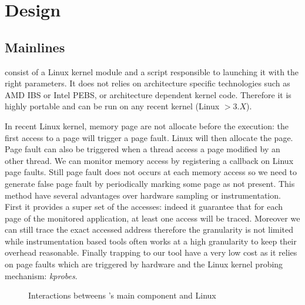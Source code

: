 \section{Design}
\label{sec:design}

\subsection{Mainlines}

\Moca consist of a Linux kernel module and a script responsible to launching it
with the right parameters. It does not relies on architecture specific
technologies such as AMD IBS or Intel PEBS, or architecture dependent kernel
code. Therefore it is highly portable and can be run on any recent kernel
(Linux $> 3.X$).

In recent Linux kernel, memory page are not allocate before the execution: the
first access to a page will trigger a page fault. Linux will then allocate the
page. Page fault can also be triggered when a thread access a page modified by
an other thread. We can monitor memory access by registering a callback on
Linux page faults. Still page fault does not occurs at each memory access so
we need to generate false page fault by periodically marking some page as not
present. This method have several advantages over hardware sampling or
instrumentation. First it provides a super set of the accesses: indeed it
guarantee that for each page of the monitored application, at least one access
will be traced. Moreover we can still trace the exact accessed address
therefore the granularity is not limited while instrumentation based tools
often works at a high granularity to keep their overhead reasonable.  Finally
trapping to our tool have a very low cost as it relies on page faults which
are triggered by hardware and the Linux kernel probing mechanism:
\emph{kprobes}.

\begin{figure}[htb]
    \centering
    \caption{Interactions betweens \Moca's main component and Linux}
    \label{fig:moca}
\end{figure}


